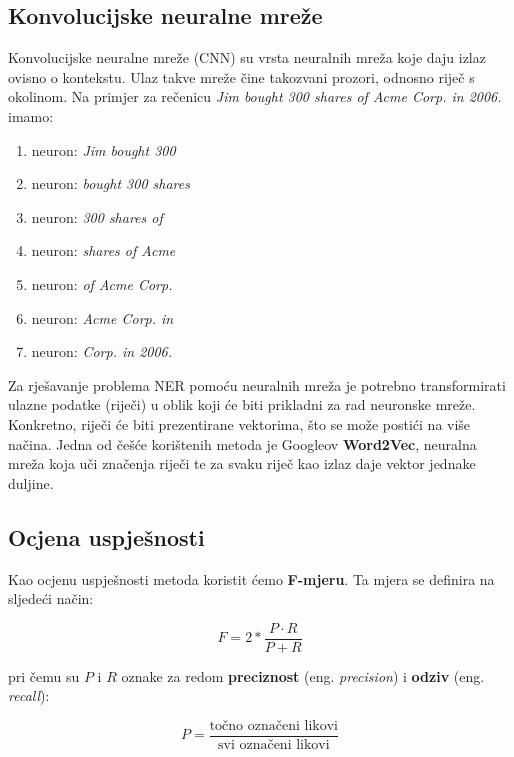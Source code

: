 \documentclass[]{article}
\begin{document}
	\subsection{Konvolucijske neuralne mreže}
	
	Konvolucijske neuralne mreže (CNN) su vrsta neuralnih mreža koje daju izlaz ovisno o kontekstu. Ulaz takve mreže čine takozvani prozori, odnosno riječ s okolinom. Na primjer za rečenicu \textit{Jim bought 300 shares of Acme Corp. in 2006.} imamo:
	
	\begin{enumerate}
		\item neuron: \textit{Jim bought 300}
		\item neuron: \textit{bought 300 shares}
		\item neuron: \textit{300 shares of}
		\item neuron: \textit{shares of Acme}
		\item neuron: \textit{of Acme Corp.}
		\item neuron: \textit{Acme Corp. in}
		\item neuron: \textit{Corp. in 2006.}
	\end{enumerate}
	
	Za rješavanje problema NER pomoću neuralnih mreža je potrebno transformirati ulazne podatke (riječi) u oblik koji će biti prikladni za rad neuronske mreže. Konkretno, riječi će biti prezentirane vektorima, što se može postići na više načina. Jedna od češće korištenih metoda je Googleov \textbf{Word2Vec}, neuralna mreža koja uči značenja riječi te za svaku riječ kao izlaz daje vektor jednake duljine.
	
	\subsection{Ocjena uspješnosti}
	
	Kao ocjenu uspješnosti metoda koristit ćemo \textbf{F-mjeru}. Ta mjera se definira na sljedeći način:
	
	\begin{equation*}
		F = 2 * \frac{P \cdot R}{P + R}
	\end{equation*}
	
	pri čemu su $P$ i $R$ oznake za redom \textbf{preciznost} (eng. \textit{precision}) i \textbf{odziv} (eng. \textit{recall}):
	
	\begin{equation*}
		P = \frac{\text{točno označeni likovi}}{\text{svi označeni likovi}}
	\end{equation*}
	
\end{document}
